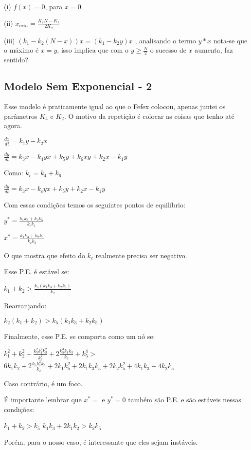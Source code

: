 \vspace{3 mm}
(i) $f(x) = 0$, para $ x=0 $

\vspace{3 mm}
(ii) $x_{min} = \frac{K_2 N - K_1}{2K_2}$

\vspace{3 mm}
(iii) $(k_1 - k_2 (N-x))x=(k_1 - k_2 y)x$ , analisando o termo $y*x$ nota-se que o máximo é $x=y$, isso implica que com o $y \geq \frac{N}{2}$ o sucesso de $x$ aumenta, faz sentido?


\subsection{Modelo Sem Exponencial - 2}
Esse modelo é praticamente igual ao que o Fefex colocou, apenas juntei os parâmetros $K_4$ e $K_2$. O motivo da repetição é colocar as coisas que tenho até agora.

\vspace{3 mm}
$\frac{dx}{dt} = k_1 y - k_2 x$

\vspace{3 mm}
$\frac{dy}{dt} = k_3 x - k_4 y x + k_5 y + k_6 x y + k_2 x - k_1 y$

\vspace{3 mm}
Como: $k_c= k_4+k_6$

\vspace{3 mm}
$\frac{dy}{dt} = k_3 x - k_c y x + k_5 y + k_2 x - k_1 y$

Com essas condições temos os seguintes pontos de equilíbrio:

$y^* = \frac{k_1 k_3 + k_2 k_5}{k_c k_1}$

\vspace{3 mm}
$x^* = \frac{k_1 k_3 + k_2 k_5}{k_c k_2}$

O que mostra que efeito do $k_c$ realmente precisa ser negativo.

Esse P.E. é estável se:


$k_1 + k_2 > \frac{k_5(k_1 k_3 + k_2 k_5)}{k_2}$
\vspace{3 mm}

Rearranjando:

\vspace{3 mm}
$k_2(k_1 + k_2) > k_5(k_1 k_3 + k_2 k_5)$

Finalmente, esse P.E. se comporta como um nó se:

$k^2_1 + k_2^2 + \frac{k_5^2 k_1^2 k_3^2}{k_2^2} +2 \frac{k_5^3 k_1 k_3}{k_2} +k_5^4 > $
$ 6 k_1 k_2 + 2 \frac{k_5 k_1^2 k_3}{k_2} + 2 k_1 k_5^2 + 2k_1 k_3 k_5 + 2 k_2 k_5^2 + 4 k_1 k_3 + 4 k_2 k_5$ 

Caso contrário, é um foco.

É importante lembrar que $x^*=$ e $y^*=0$ também são P.E. e são estáveis nessas condições:

\vspace{3 mm}
$k_1 + k_2 > k_5$
$k_1 k_3 + 2k_1 k_2 > k_2 k_5$

Porém, para o nosso caso, é interessante que eles sejam instáveis.
